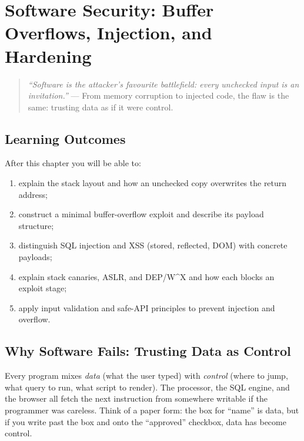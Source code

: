 \chapter{Software Security: Buffer Overflows, Injection, and Hardening}
\label{ch:software}
\begin{quote}
\emph{``Software is the attacker's favourite battlefield: every unchecked input is an invitation.''} --- From memory corruption to injected code, the flaw is the same: trusting data as if it were control.
\end{quote}

\noindent{}

\section*{Learning Outcomes}
After this chapter you will be able to:
\begin{enumerate}[label=(L\arabic*)]
    \item explain the stack layout and how an unchecked copy overwrites the return address;
    \item construct a minimal buffer-overflow exploit and describe its payload structure;
    \item distinguish SQL injection and XSS (stored, reflected, DOM) with concrete payloads;
    \item explain stack canaries, ASLR, and DEP/W\textasciicircum X and how each blocks an exploit stage;
    \item apply input validation and safe-API principles to prevent injection and overflow.
\end{enumerate}

\section{Why Software Fails: Trusting Data as Control}
\label{sec:why-software-fails}
Every program mixes \emph{data} (what the user typed) with \emph{control} (where to jump, what query to run, what script to render). The processor, the SQL engine, and the browser all fetch the next instruction from somewhere writable if the programmer was careless. Think of a paper form: the box for ``name'' is data, but if you write past the box and onto the ``approved'' checkbox, data has become control.

